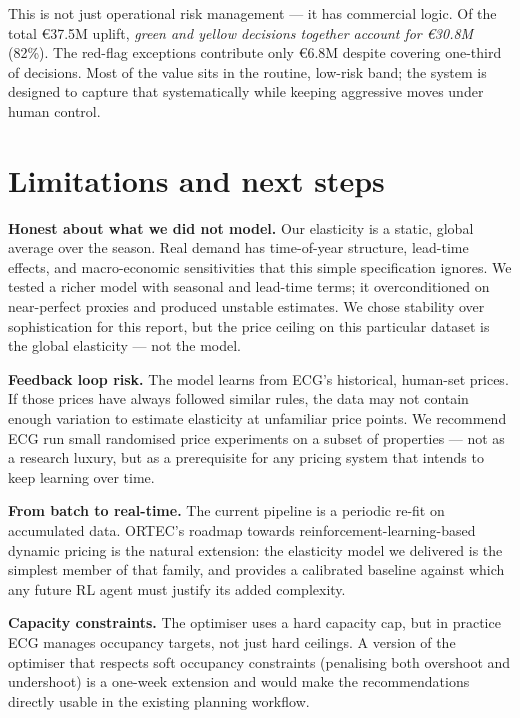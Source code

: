 \documentclass[11pt,a4paper]{article}
\begin{document}
This is not just operational risk management --- it has commercial logic. Of the total \euro{}37.5M uplift, \emph{green and yellow decisions together account for \euro{}30.8M} (82\%). The red-flag exceptions contribute only \euro{}6.8M despite covering one-third of decisions. Most of the value sits in the routine, low-risk band; the system is designed to capture that systematically while keeping aggressive moves under human control.

\section{Limitations and next steps}

\textbf{Honest about what we did not model.} Our elasticity is a static, global average over the season. Real demand has time-of-year structure, lead-time effects, and macro-economic sensitivities that this simple specification ignores. We tested a richer model with seasonal and lead-time terms; it overconditioned on near-perfect proxies and produced unstable estimates. We chose stability over sophistication for this report, but the price ceiling on this particular dataset is the global elasticity --- not the model.

\textbf{Feedback loop risk.} The model learns from ECG's historical, human-set prices. If those prices have always followed similar rules, the data may not contain enough variation to estimate elasticity at unfamiliar price points. We recommend ECG run small randomised price experiments on a subset of properties --- not as a research luxury, but as a prerequisite for any pricing system that intends to keep learning over time.

\textbf{From batch to real-time.} The current pipeline is a periodic re-fit on accumulated data. ORTEC's roadmap towards reinforcement-learning-based dynamic pricing is the natural extension: the elasticity model we delivered is the simplest member of that family, and provides a calibrated baseline against which any future RL agent must justify its added complexity.

\textbf{Capacity constraints.} The optimiser uses a hard capacity cap, but in practice ECG manages occupancy targets, not just hard ceilings. A version of the optimiser that respects soft occupancy constraints (penalising both overshoot and undershoot) is a one-week extension and would make the recommendations directly usable in the existing planning workflow.
\end{document}
